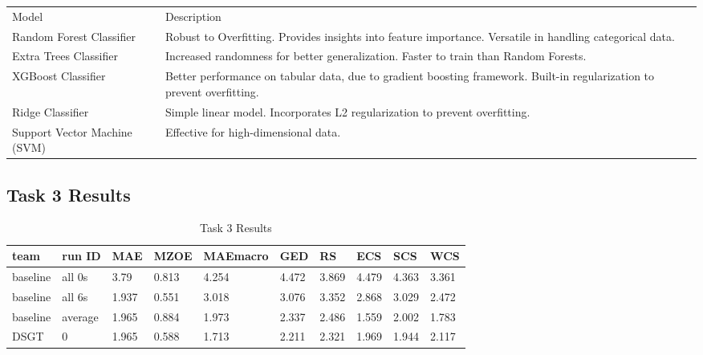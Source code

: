 \documentclass[]{style/ceurart}
\begin{document}
\begin{table}[]
\begin{tabular}{|l|l|l}
\cline{1-2}
Model                        & Description                                                                                                             &  \\ \cline{1-2}
Random Forest Classifier     & Robust to Overfitting. Provides insights into feature importance. Versatile in handling categorical data.               &  \\ \cline{1-2}
Extra Trees Classifier       & Increased randomness for better generalization. Faster to train than Random Forests.                                    &  \\ \cline{1-2}
XGBoost Classifier           & Better performance on tabular data, due to gradient boosting framework. Built-in regularization to prevent overfitting. &  \\ \cline{1-2}
Ridge Classifier             & Simple linear model. Incorporates L2 regularization to prevent overfitting.                                             &  \\ \cline{1-2}
Support Vector Machine (SVM) & Effective for high-dimensional data.                                                                                    &  \\ \cline{1-2}
\end{tabular}
\end{table}

\subsection{Task 3 Results}

\begin{table}[]
\caption{Task 3 Results}
\begin{tabular}{llllllllll}
team     & run ID  & MAE   & MZOE  & MAEmacro & GED   & RS    & ECS   & SCS   & WCS   \\ \hline
baseline & all 0s  & 3.79  & 0.813 & 4.254    & 4.472 & 3.869 & 4.479 & 4.363 & 3.361 \\
baseline & all 6s  & 1.937 & 0.551 & 3.018    & 3.076 & 3.352 & 2.868 & 3.029 & 2.472 \\
baseline & average & 1.965 & 0.884 & 1.973    & 2.337 & 2.486 & 1.559 & 2.002 & 1.783 \\ \hline
DSGT     & 0       & 1.965 & 0.588 & 1.713    & 2.211 & 2.321 & 1.969 & 1.944 & 2.117
\end{tabular}
\end{table}
\end{document}
